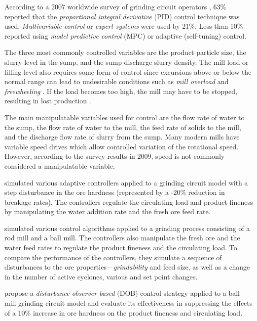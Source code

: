According to a 2007 worldwide survey of grinding circuit operators \citep{wei_grinding_2009}, 63\% reported that the \textit{proportional integral derivative} (PID) control technique was used. \textit{Multivariable control} or \textit{expert systems} were used by 21\%. Less than 10\% reported using \textit{model predictive control} (MPC) or adaptive (self-tuning) control.

The three most commonly controlled variables are the product particle size, the slurry level in the sump, and the sump discharge slurry density. The mill load or filling level also requires some form of control since excursions above or below the normal range can lead to undesirable conditions such as \textit{mill overload} and \textit{freewheeling} \citep{mcclure_overload_2015}. If the load becomes too high, the mill may have to be stopped, resulting in lost production \citep{wei_grinding_2009}.

The main manipulatable variables used for control are the flow rate of water to the sump, the flow rate of water to the mill, the feed rate of solids to the mill, and the discharge flow rate of slurry from the sump. Many modern mills have variable speed drives which allow controlled variation of the rotational speed. However, according to the survey results in 2009, speed is not commonly considered a manipulatable variable.

\cite{najim_adaptive_1995} simulated various adaptive controllers applied to a grinding circuit model with a step disturbance in the ore hardness (represented by a -20\% reduction in breakage rates). The controllers regulate the circulating load and product fineness by manipulating the water addition rate and the fresh ore feed rate.

\cite{pomerleau_survey_2000} simulated various control algorithms applied to a grinding process consisting of a rod mill and a ball mill. The controllers also manipulate the fresh ore and the water feed rates to regulate the product fineness and the circulating load. To compare the performance of the controllers, they simulate a sequence of disturbances to the ore properties---\textit{grindability} and feed size, as well as a change in the number of active cyclones, various and set point changes.

\cite{chen_disturbance_2009} propose a \textit{disturbance observer based} (DOB) control strategy applied to a ball mill grinding circuit model and evaluate its effectiveness in suppressing the effects of a 10\% increase in ore hardness on the product fineness and circulating load.

